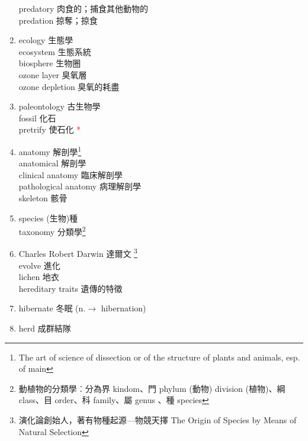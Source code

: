 \documentclass[twoside,b5paper]{book}
\begin{document}
\begin{enumerate}
      predatory 肉食的；捕食其他動物的\\
      predation  掠奪；掠食
    \item
      ecology 生態學\\
      ecosystem  生態系統\\
      biosphere  生物圈\\
      ozone  layer 臭氧層\\
      ozone depletion 臭氧的耗盡
    \item
      paleontology  古生物學\\
      fossil  化石\\
      pretrify 使石化 \textcolor{red}{*}
    \item
      anatomy  解剖學\footnote{The art of science of dissection or of the structure of plants and animals, esp. of main}\\
      anatomical 解剖學\\
      clinical anatomy 臨床解剖學\\
      pathological  anatomy 病理解剖學\\
      skeleton  骸骨
    \item
      species  (生物)種\\
      taxonomy  分類學\footnote{動植物的分類學︰分為界 kindom、門 phylum  (動物) division (植物)、綱 class、目 order、科 family、屬 genus 、種 species }
    \item
      Charles Robert Darwin 達爾文 \footnote{演化論創始人，著有物種起源---物競天擇 The Origin of Species by Means of Natural Selection}\\
      evolve  進化 \\
      lichen  地衣\\
      hereditary  traits 遺傳的特徵
    \item
      hibernate 冬眠 (n.$\to$ hibernation)
    \item
      herd 成群結隊\\

\end{enumerate}
\end{document}
